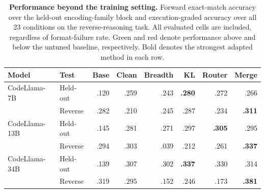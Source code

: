 \begin{table}[!t]
\centering
\small
\setlength{\tabcolsep}{4pt}
\renewcommand{\arraystretch}{0.98}

\caption{\textbf{Performance beyond the training setting.}
Forward exact-match accuracy over the held-out encoding-family block and
execution-graded accuracy over all 23 conditions on the reverse-reasoning task.
All evaluated cells are included, regardless of format-failure rate.
Green and red denote performance above and below the untuned baseline,
respectively. Bold denotes the strongest adapted method in each row.}
\label{tab:rq3_stress}

\begin{tabular}{@{}llrrrrrr@{}}
\toprule
\textbf{Model} &
\textbf{Test} &
\textbf{Base} &
\textbf{Clean} &
\textbf{Breadth} &
\textbf{KL} &
\textbf{Router} &
\textbf{Merge} \\
\midrule

CodeLlama-7B
& Held-out
& .120
& \textcolor{green!55!black}{.259}
& \textcolor{green!55!black}{.243}
& \textbf{\textcolor{green!55!black}{.280}}
& \textcolor{green!55!black}{.272}
& \textcolor{green!55!black}{.266} \\
& Reverse
& .282
& \textcolor{red!70!black}{.210}
& \textcolor{red!70!black}{.245}
& \textcolor{green!55!black}{.287}
& \textcolor{red!70!black}{.234}
& \textbf{\textcolor{green!55!black}{.311}} \\

\addlinespace[2pt]

CodeLlama-13B
& Held-out
& .145
& \textcolor{green!55!black}{.281}
& \textcolor{green!55!black}{.271}
& \textcolor{green!55!black}{.297}
& \textbf{\textcolor{green!55!black}{.305}}
& \textcolor{green!55!black}{.295} \\
& Reverse
& .294
& \textcolor{green!55!black}{.303}
& \textcolor{red!70!black}{.039}
& \textcolor{red!70!black}{.212}
& \textcolor{red!70!black}{.261}
& \textbf{\textcolor{green!55!black}{.337}} \\

\addlinespace[2pt]

CodeLlama-34B
& Held-out
& .139
& \textcolor{green!55!black}{.307}
& \textcolor{green!55!black}{.302}
& \textbf{\textcolor{green!55!black}{.337}}
& \textcolor{green!55!black}{.330}
& \textcolor{green!55!black}{.314} \\
& Reverse
& .319
& \textcolor{red!70!black}{.295}
& \textcolor{red!70!black}{.152}
& \textcolor{red!70!black}{.246}
& \textcolor{red!70!black}{.173}
& \textbf{\textcolor{green!55!black}{.381}} \\


\end{tabular}
\end{table}
